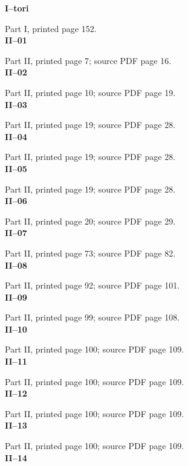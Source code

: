 \documentclass[11pt,a4paper,oneside]{book}
\begin{document}
\pagestyle{plain}
\noindent\textbf{I--tori}\par
\smallskip
Part I, printed page 152.
\vfill
\[

\]
\vfill
\newpage
\noindent\textbf{II--01}\par
\smallskip
Part II, printed page 7; source PDF page 16.
\vfill
\[

\]
\vfill
\newpage
\noindent\textbf{II--02}\par
\smallskip
Part II, printed page 10; source PDF page 19.
\vfill
\[

\]
\vfill
\newpage
\noindent\textbf{II--03}\par
\smallskip
Part II, printed page 19; source PDF page 28.
\vfill
\[

\]
\vfill
\newpage
\noindent\textbf{II--04}\par
\smallskip
Part II, printed page 19; source PDF page 28.
\vfill
\[

\]
\vfill
\newpage
\noindent\textbf{II--05}\par
\smallskip
Part II, printed page 19; source PDF page 28.
\vfill
\[

\]
\vfill
\newpage
\noindent\textbf{II--06}\par
\smallskip
Part II, printed page 20; source PDF page 29.
\vfill
\[

\]
\vfill
\newpage
\noindent\textbf{II--07}\par
\smallskip
Part II, printed page 73; source PDF page 82.
\vfill
\[

\]
\vfill
\newpage
\noindent\textbf{II--08}\par
\smallskip
Part II, printed page 92; source PDF page 101.
\vfill
\[

\]
\vfill
\newpage
\noindent\textbf{II--09}\par
\smallskip
Part II, printed page 99; source PDF page 108.
\vfill
\[

\]
\vfill
\newpage
\noindent\textbf{II--10}\par
\smallskip
Part II, printed page 100; source PDF page 109.
\vfill
\[

\]
\vfill
\newpage
\noindent\textbf{II--11}\par
\smallskip
Part II, printed page 100; source PDF page 109.
\vfill
\[

\]
\vfill
\newpage
\noindent\textbf{II--12}\par
\smallskip
Part II, printed page 100; source PDF page 109.
\vfill
\[

\]
\vfill
\newpage
\noindent\textbf{II--13}\par
\smallskip
Part II, printed page 100; source PDF page 109.
\vfill
\[

\]
\vfill
\newpage
\noindent\textbf{II--14}\par
\end{document}

